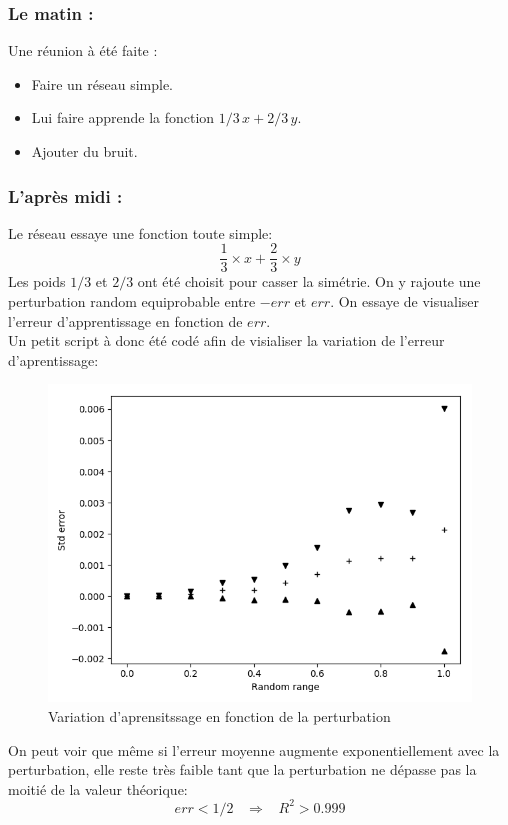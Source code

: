 \subsubsection*{Le matin :}
Une réunion à été faite :
\begin{itemize}
    \item Faire un réseau simple.
    \item Lui faire apprende la fonction $1/3\, x + 2/3\, y$.
    \item Ajouter du bruit.
\end{itemize}

\subsubsection*{L'après midi :}
Le réseau essaye une fonction toute simple:
\begin{equation}
    \frac{1}{3} \times x + \frac{2}{3} \times y
\end{equation}
Les poids $1/3$ et $2/3$ ont été choisit pour casser la simétrie.
On y rajoute une perturbation random equiprobable entre $-err$ et $err$.
On essaye de visualiser l'erreur d'apprentissage en fonction de $err$. \\
Un petit script à donc été codé afin de visialiser la variation de l'erreur d'aprentissage:

\begin{figure}[H]
    \center
    \includegraphics[height=\moyen]{sources/data/Obj2/tiers/graph1.png}
	\caption{Variation d'aprensitssage en fonction de la perturbation}
	\label{obj2tiers1}
\end{figure}

On peut voir que même si l'erreur moyenne augmente exponentiellement avec la perturbation,
elle reste très faible tant que la perturbation ne dépasse pas la moitié de la valeur théorique:
\begin{equation}
    err < 1/2 \; \; \; \Rightarrow \; \; \; R^2 > 0.999
\end{equation}

